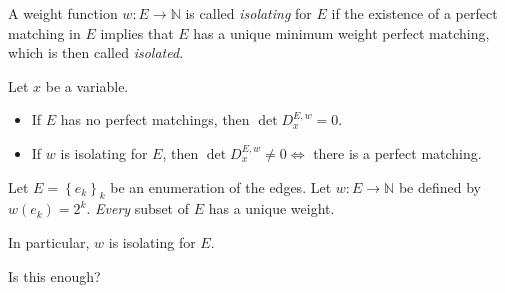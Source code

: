 \documentclass{beamer}
\theoremstyle{remark}
\newcommand{\nn}{\mathbb{N}}
\begin{document}
\begin{frame}
  \begin{definition}
    A weight function $w : E \to \nn$ is called \emph{isolating} for
    $E$ if the existence of a perfect matching in $E$
    implies that $E$ has a unique minimum weight perfect matching,
    which is then called \emph{isolated}.
  \end{definition}

  \begin{corollary}
    Let $x$ be a variable.
    \begin{itemize}
      \item If $E$ has no perfect matchings, then
            $\det D_x^{E,w} = 0$.
      \item If $w$ is isolating for $E$,
            then $\det D_x^{E,w} \ne 0 \iff $ there is a perfect matching.
    \end{itemize}
  \end{corollary}

  \begin{example}
    Let $E = \left\{e_k\right\}_k$ be an enumeration of the edges.
    Let $w : E \to \nn$ be defined by
    $w(e_k) = 2^k$. \emph{Every} subset of $E$ has a unique
    weight.

    In particular, $w$ is isolating for $E$.

    Is this enough?
  \end{example}
\end{frame}
\end{document}
